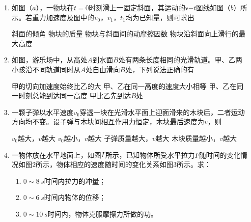 \begin{enumerate}[leftmargin=0em]
\item 
{}
如图（$ a $），一物块在$ t=0 $时刻滑上一固定斜面，其运动的ν$ -t $图线如图（$ b $）所示。若重力加速度及图中的$ v_{0} $，$ v_{1} $，$ t_{1} $均为已知量，则可求出  
\begin{figure}[h!]
\centering

\end{figure}

\fourchoices
{斜面的倾角}
{物块的质量}
{物块与斜面间的动摩擦因数}
{物块沿斜面向上滑行的最大高度}

\item 
{}
如图，游乐场中，从高处$ A $到水面$ B $处有两条长度相同的光滑轨道。甲、乙两小孩沿不同轨道同时从$ A $处自由滑向$ B $处，下列说法正确的有  
\begin{figure}[h!]
\centering

\end{figure}

\fourchoices
{甲的切向加速度始终比乙的大}
{甲、乙在同一高度的速度大小相等}
{甲、乙在同一时刻总能到达同一高度}
{甲比乙先到达$ B $处}

\item 
{}
一颗子弹以水平速度$ v_{0} $穿透一块在光滑水平面上迎面滑来的木块后，二者运动方向均不变。设子弹与木块间相互作用力恒定，木块最后速度为$ v $，则  


\fourchoices
{$ v_{0} $越大，$ v $越大}
{$ v_{0} $越小，$ v $越大}
{子弹质量越大，$ v $越大}
{木块质量越小，$ v $越大}


\newpage
\item 
{}
一物体放在水平地面上，如图$ \lmd{1} $所示，已知物体所受水平拉力$ F $随时间的变化情况如图$ 2 $所示，物体相应的速度随时间的变化关系如图$ 3 $所示。求：
\begin{enumerate}
\renewcommand{\labelenumi}{\arabic{enumi}.}
\item
$ 0 \sim 8\ s $时间内拉力的冲量；
\item 
$ 0 \sim 6\ s $时间内物体的位移；
\item 
$ 0 \sim 10\ s $时间内，物体克服摩擦力所做的功。



\end{enumerate}
\begin{figure}[h!]
\flushright

\end{figure}




\end{enumerate}
